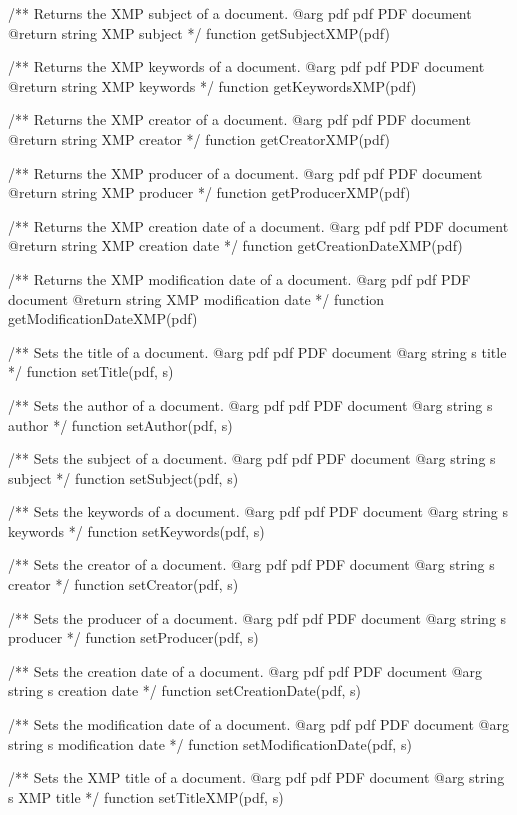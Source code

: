 /** Returns the XMP subject of a document.
@arg {pdf} pdf PDF document
@return {string} XMP subject */
function getSubjectXMP(pdf) {}

/** Returns the XMP keywords of a document.
@arg {pdf} pdf PDF document
@return {string} XMP keywords */
function getKeywordsXMP(pdf) {}

/** Returns the XMP creator of a document.
@arg {pdf} pdf PDF document
@return {string} XMP creator */
function getCreatorXMP(pdf) {}

/** Returns the XMP producer of a document.
@arg {pdf} pdf PDF document
@return {string} XMP producer */
function getProducerXMP(pdf) {}

/** Returns the XMP creation date of a document.
@arg {pdf} pdf PDF document
@return {string} XMP creation date */
function getCreationDateXMP(pdf) {}

/** Returns the XMP modification date of a document.
@arg {pdf} pdf PDF document
@return {string} XMP modification date */
function getModificationDateXMP(pdf) {}

/** Sets the title of a document.
@arg {pdf} pdf PDF document
@arg {string} s title */
function setTitle(pdf, s) {}

/** Sets the author of a document.
@arg {pdf} pdf PDF document
@arg {string} s author */
function setAuthor(pdf, s) {}

/** Sets the subject of a document.
@arg {pdf} pdf PDF document
@arg {string} s subject */
function setSubject(pdf, s) {}

/** Sets the keywords of a document.
@arg {pdf} pdf PDF document
@arg {string} s keywords */
function setKeywords(pdf, s) {}

/** Sets the creator of a document.
@arg {pdf} pdf PDF document
@arg {string} s creator */
function setCreator(pdf, s) {}

/** Sets the producer of a document.
@arg {pdf} pdf PDF document
@arg {string} s producer */
function setProducer(pdf, s) {}

/** Sets the creation date of a document.
@arg {pdf} pdf PDF document
@arg {string} s creation date */
function setCreationDate(pdf, s) {}

/** Sets the modification date of a document.
@arg {pdf} pdf PDF document
@arg {string} s modification date */
function setModificationDate(pdf, s) {}

/** Sets the XMP title of a document.
@arg {pdf} pdf PDF document
@arg {string} s XMP title */
function setTitleXMP(pdf, s) {}

